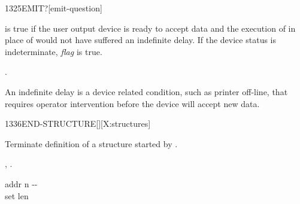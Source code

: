 \begin{worddef}[EMITq]{1325}{EMIT?}[emit-question]
\item {}

	 is true if the user output device is ready to
	accept data and the execution of  in place of
	 would not have suffered an indefinite delay. If
	the device status is indeterminate, \emph{flag} is true.

\see {}.

	\begin{rationale} %
		An indefinite delay is a device related condition, such as
		printer off-line, that requires operator intervention before
		the device will accept new data.
	\end{rationale}
\end{worddef}

\begin{worddef}{1336}{END-STRUCTURE}[][X:structures]
\item {}

	Terminate definition of a structure started by
	.

\see {},
	.

	\begin{implement} %

		\word{:} \tab{} addr n -{}- \\
		\tab {} \word{!} \word{;} \tab[4.2] set len
	\end{implement}
\end{worddef}

